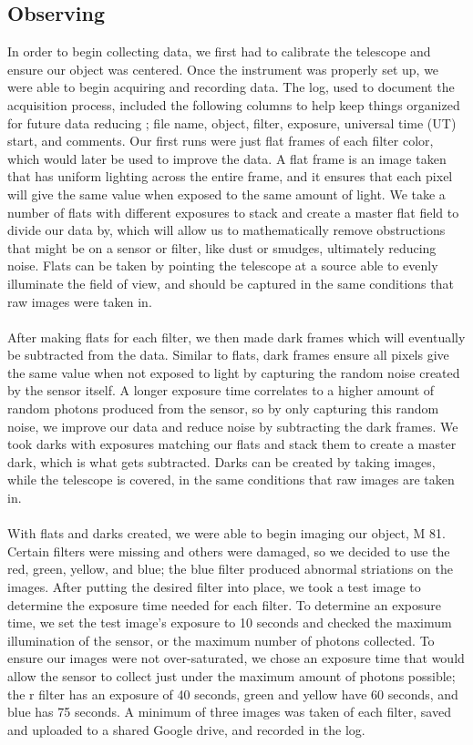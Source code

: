 \documentclass[]{aastex63}
\begin{document}
\subsection{Observing}
In order to begin collecting data, we first had to calibrate the telescope and ensure our object was centered. Once the instrument was properly set up, we were able to begin acquiring and recording data. The log, used to document the acquisition process, included the following columns to help keep things organized for future data reducing ; file name, object, filter, exposure, universal time (UT) start, and comments. Our first runs were just flat frames of each filter color, which would later be used to improve the data. A flat frame is an image taken that has uniform lighting across the entire frame, and it ensures that each pixel will give the same value when exposed to the same amount of light. We take a number of flats with different exposures to stack and create a master flat field to divide our data by, which will allow us to mathematically remove obstructions that might be on a sensor or filter, like dust or smudges, ultimately reducing noise. Flats can be taken by pointing the telescope at a source able to evenly illuminate the field of view, and should be captured in the same conditions that raw images were taken in.
\\
\\
After making flats for each filter, we then made dark frames which will eventually be subtracted from the data. Similar to flats, dark frames ensure all pixels give the same value when not exposed to light by capturing the random noise created by the sensor itself. A longer exposure time correlates to a higher amount of random photons produced from the sensor, so by only capturing this random noise, we improve our data and reduce noise by subtracting the dark frames. We took darks with exposures matching our flats and stack them to create a master dark, which is what gets subtracted. Darks can be created by taking images, while the telescope is covered, in the same conditions that raw images are taken in. 
\\
\\
With flats and darks created, we were able to begin imaging our object, M 81. Certain filters were missing and others were damaged, so we decided to use the red, green, yellow, and blue; the blue filter produced abnormal striations on the images. After putting the desired filter into place, we took a test image to determine the exposure time needed for each filter. To determine an exposure time, we set the test image's exposure to 10 seconds and checked the maximum illumination of the sensor, or the maximum number of photons collected. To ensure our images were not over-saturated, we chose an exposure time that would allow the sensor to collect just under the maximum amount of photons possible; the r filter has an exposure of 40 seconds, green and yellow have 60 seconds, and blue has 75 seconds. A minimum of three images was taken of each filter, saved and uploaded to a shared Google drive, and recorded in the log.
\end{document}
